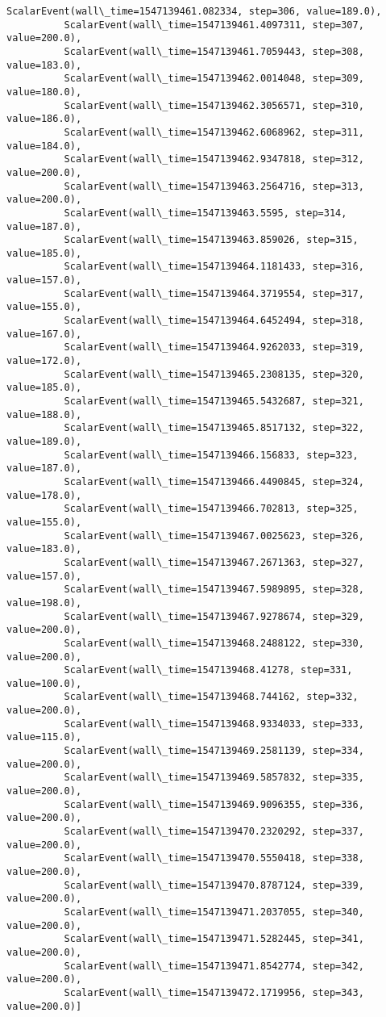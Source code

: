 \documentclass[11pt]{article}
\begin{document}
\begin{Verbatim}[commandchars=\\\{\}]
          ScalarEvent(wall\_time=1547139461.082334, step=306, value=189.0),
          ScalarEvent(wall\_time=1547139461.4097311, step=307, value=200.0),
          ScalarEvent(wall\_time=1547139461.7059443, step=308, value=183.0),
          ScalarEvent(wall\_time=1547139462.0014048, step=309, value=180.0),
          ScalarEvent(wall\_time=1547139462.3056571, step=310, value=186.0),
          ScalarEvent(wall\_time=1547139462.6068962, step=311, value=184.0),
          ScalarEvent(wall\_time=1547139462.9347818, step=312, value=200.0),
          ScalarEvent(wall\_time=1547139463.2564716, step=313, value=200.0),
          ScalarEvent(wall\_time=1547139463.5595, step=314, value=187.0),
          ScalarEvent(wall\_time=1547139463.859026, step=315, value=185.0),
          ScalarEvent(wall\_time=1547139464.1181433, step=316, value=157.0),
          ScalarEvent(wall\_time=1547139464.3719554, step=317, value=155.0),
          ScalarEvent(wall\_time=1547139464.6452494, step=318, value=167.0),
          ScalarEvent(wall\_time=1547139464.9262033, step=319, value=172.0),
          ScalarEvent(wall\_time=1547139465.2308135, step=320, value=185.0),
          ScalarEvent(wall\_time=1547139465.5432687, step=321, value=188.0),
          ScalarEvent(wall\_time=1547139465.8517132, step=322, value=189.0),
          ScalarEvent(wall\_time=1547139466.156833, step=323, value=187.0),
          ScalarEvent(wall\_time=1547139466.4490845, step=324, value=178.0),
          ScalarEvent(wall\_time=1547139466.702813, step=325, value=155.0),
          ScalarEvent(wall\_time=1547139467.0025623, step=326, value=183.0),
          ScalarEvent(wall\_time=1547139467.2671363, step=327, value=157.0),
          ScalarEvent(wall\_time=1547139467.5989895, step=328, value=198.0),
          ScalarEvent(wall\_time=1547139467.9278674, step=329, value=200.0),
          ScalarEvent(wall\_time=1547139468.2488122, step=330, value=200.0),
          ScalarEvent(wall\_time=1547139468.41278, step=331, value=100.0),
          ScalarEvent(wall\_time=1547139468.744162, step=332, value=200.0),
          ScalarEvent(wall\_time=1547139468.9334033, step=333, value=115.0),
          ScalarEvent(wall\_time=1547139469.2581139, step=334, value=200.0),
          ScalarEvent(wall\_time=1547139469.5857832, step=335, value=200.0),
          ScalarEvent(wall\_time=1547139469.9096355, step=336, value=200.0),
          ScalarEvent(wall\_time=1547139470.2320292, step=337, value=200.0),
          ScalarEvent(wall\_time=1547139470.5550418, step=338, value=200.0),
          ScalarEvent(wall\_time=1547139470.8787124, step=339, value=200.0),
          ScalarEvent(wall\_time=1547139471.2037055, step=340, value=200.0),
          ScalarEvent(wall\_time=1547139471.5282445, step=341, value=200.0),
          ScalarEvent(wall\_time=1547139471.8542774, step=342, value=200.0),
          ScalarEvent(wall\_time=1547139472.1719956, step=343, value=200.0)]
\end{Verbatim}
            
\end{document}
